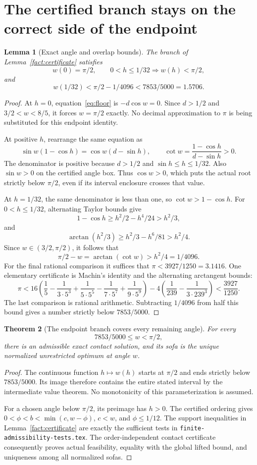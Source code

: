\documentclass[11pt]{article}
\newtheorem{theorem}{Theorem}[section]
\newtheorem{lemma}[theorem]{Lemma}
\begin{document}
\section{The certified branch stays on the correct side of the endpoint}
\begin{lemma}[Exact angle and overlap bounds]\label{lem:angles}
The branch of Lemma~\ref{fact:certificate} satisfies
\[
 w(0)=\pi/2,\qquad 0<h\le1/32\Longrightarrow w(h)<\pi/2,
\]
and
\[
 w(1/32)<\pi/2-1/4096<7853/5000=1.5706.
\]
\end{lemma}
\begin{proof}
At $h=0$, equation~\eqref{eq:floor} is $-d\cos w=0$. Since $d>1/2$ and $3/2<w<8/5$, it forces $w=\pi/2$ exactly. No decimal approximation to $\pi$ is being substituted for this endpoint identity.

At positive $h$, rearrange the same equation as
\[
 \sin w(1-\cos h)=\cos w(d-\sin h),\qquad
 \cot w=\frac{1-\cos h}{d-\sin h}>0.
\]
The denominator is positive because $d>1/2$ and $\sin h\le h\le1/32$. Also $\sin w>0$ on the certified angle box. Thus $\cos w>0$, which puts the actual root strictly below $\pi/2$, even if its interval enclosure crosses that value.

At $h=1/32$, the same denominator is less than one, so $\cot w>1-\cos h$. For $0<h\le1/32$, alternating Taylor bounds give
\[
 1-\cos h\ge h^2/2-h^4/24>h^2/3,
\]
and
\[
 \arctan(h^2/3)\ge h^2/3-h^6/81>h^2/4.
\]
Since $w\in(3/2,\pi/2)$, it follows that
\[
 \pi/2-w=\arctan(\cot w)>h^2/4=1/4096.
\]
For the final rational comparison it suffices that $\pi<3927/1250=3.1416$. One elementary certificate is Machin's identity and the alternating arctangent bounds:
\[
 \pi<16\left(\frac15-\frac1{3\cdot5^3}+\frac1{5\cdot5^5}
             -\frac1{7\cdot5^7}+\frac1{9\cdot5^9}\right)
       -4\left(\frac1{239}-\frac1{3\cdot239^3}\right)
       <\frac{3927}{1250}.
\]
The last comparison is rational arithmetic. Subtracting $1/4096$ from half this bound gives a number strictly below $7853/5000$.
\end{proof}

\begin{theorem}[The endpoint branch covers every remaining angle]
For every
\[
 7853/5000\le w<\pi/2,
\]
there is an admissible exact contact solution, and its sofa is the unique normalized unrestricted optimum at angle $w$.
\end{theorem}
\begin{proof}
The continuous function $h\mapsto w(h)$ starts at $\pi/2$ and ends strictly below $7853/5000$. Its image therefore contains the entire stated interval by the intermediate value theorem. No monotonicity of this parameterization is assumed.

For a chosen angle below $\pi/2$, its preimage has $h>0$. The certified ordering gives
$0<\phi<b<\min(c,w-\phi)$, $c<w$, and $\phi\le1/12$. The support inequalities in Lemma~\ref{fact:certificate} are exactly the sufficient tests in \texttt{finite-admissibility-tests.tex}. The order-independent contact certificate consequently proves actual feasibility, equality with the global lifted bound, and uniqueness among all normalized sofas.
\end{proof}
\end{document}
